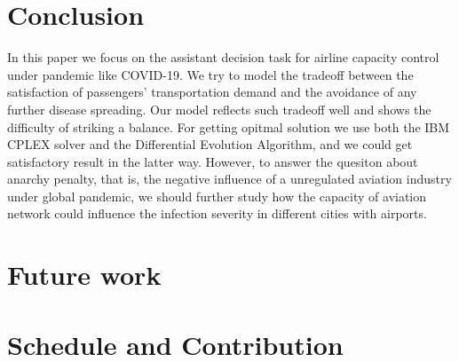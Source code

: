 \documentclass[11pt,twocolumn]{article}
\begin{document}






\section{Conclusion}
In this paper we focus on the assistant decision task for airline capacity control under pandemic like COVID-19. We try to model the tradeoff between the satisfaction of passengers' transportation demand and the avoidance of any further disease spreading. Our model reflects such tradeoff well and shows the difficulty of striking a balance. For getting opitmal solution we use both the IBM CPLEX solver and the Differential Evolution Algorithm, and we could get satisfactory result in the latter way. However, to answer the quesiton about anarchy penalty, that is, the negative influence of a unregulated aviation industry under global pandemic, we should further study how the capacity of aviation network could influence the infection severity in different cities with airports.



\section{Future work}






\section{Schedule and Contribution}
\end{document}
